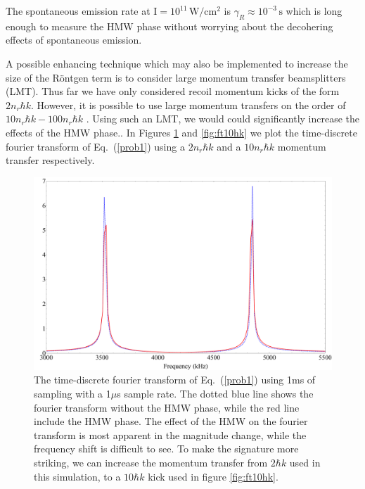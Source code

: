 \documentclass[twocolumn,english,pra,aps,superscriptaddress,floatfix]{revtex4-1}
\begin{document}
The spontaneous emission rate at $\mathrm{I=10^{11}\,W/cm^2}$ is $\gamma_{R}\approx \mathrm{10^{-3}\,s}$ which is long enough to measure the HMW phase without worrying about the decohering effects of spontaneous emission.

A possible enhancing technique which may also be implemented to increase the size of the R\"{o}ntgen term is to consider large momentum transfer beamsplitters (LMT). Thus far we have only considered recoil momentum kicks of the form $2n_r\hbar k$. However, it is possible to use large momentum transfers on the order of $10 n_r\hbar k-100 n_r\hbar k$ \cite{kasevich}.  Using such an LMT, we would could significantly increase the effects of the HMW phase..  In Figures \ref{fig:ft2hk} and \ref{fig:ft10hk} we plot the time-discrete fourier transform of Eq.\ (\ref{prob1}) using a $2n_r\hbar k$ and a $10n_r\hbar k$ momentum transfer respectively.
\begin{figure}
\includegraphics[width=1\columnwidth]{FT2hk.pdf}
\caption{The time-discrete fourier transform of Eq.\ (\ref{prob1}) using 1ms of sampling with a 1$\mu$s sample rate. The dotted blue line shows the fourier transform without the HMW phase, while the red line include the HMW phase. The effect of the HMW on the fourier transform is most apparent in the magnitude change, while the frequency shift is difficult to see.  To make the signature more striking, we can increase the momentum transfer from $2\hbar k$ used in this simulation, to a $10\hbar k$ kick used in figure \ref{fig:ft10hk}.} 
\label{fig:ft2hk}
\end{figure}
\end{document}

